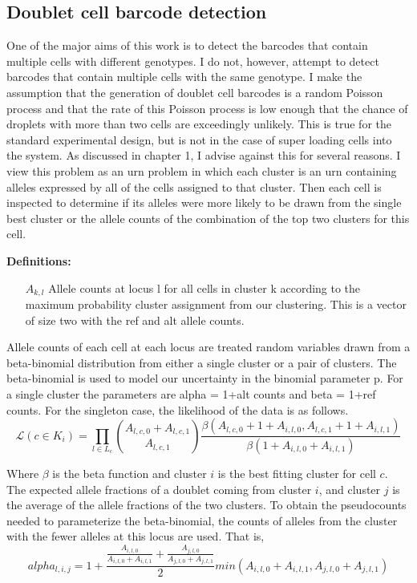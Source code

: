 \subsection{Doublet cell barcode detection}
\par{
One of the major aims of this work is to detect the barcodes that contain multiple cells with different genotypes. 
I do not, however, attempt to detect barcodes that contain multiple cells with the same genotype. I make the assumption that 
the generation of doublet cell barcodes is a random Poisson process and that the rate of this Poisson process is low enough that 
the chance of droplets with more than two cells are exceedingly unlikely. This is true for the standard experimental design, but is not in the case of super loading cells into the system. As discussed in chapter 1, I advise against this for several reasons. I view this problem 
as an urn problem in which each cluster is an urn containing alleles expressed by all of the cells assigned to that cluster. Then each cell is inspected to determine if its alleles were more likely to be drawn from the single best cluster or the allele counts of
the combination of the top two clusters for this cell. \\
}  





\textbf{Definitions:}
\begin{itemize}
\item[$A_{k,l}$] Allele counts at locus l for all cells in cluster k according to the maximum probability cluster assignment from our clustering. This is a vector of size two with the ref and alt allele counts.
\end{itemize}

Allele counts of each cell at each locus are treated random variables drawn from a beta-binomial distribution from either a single cluster or a pair of clusters. The beta-binomial is used to model our uncertainty in the binomial parameter p. For a single cluster the parameters are alpha = 1+alt counts and beta = 1+ref counts. 
For the singleton case, the likelihood of the data is as follows.
\begin{equation}
\mathcal{L}(c \in K_i) = \prod_{l \in L_c} {A_{l,c,0} + A_{l,c,1}  \choose A_{l,c,1}} \frac{\beta(A_{l,c,0} + 1 + A_{i,l,0}, A_{l,c,1} + 1 + A_{i,l,1})}{\beta(1+A_{i,l,0} + A_{i,l,1})}
\end{equation}


Where $\beta$ is the beta function and cluster $i$ is the best fitting cluster for cell $c$. \\
The expected allele fractions of a doublet coming from cluster $i$, and cluster $j$ is the average of the allele fractions of the two clusters. To obtain the pseudocounts needed to parameterize the beta-binomial, the counts of alleles from the cluster with the fewer alleles at this locus are used. That is, 
\begin{equation}
alpha_{l,i,j} = 1 + \frac{\frac{A_{i,l,0}}{A_{i,l,0}+A_{i,l,1}} + \frac{A_{j,l,0}}{A_{j,l,0}+A_{j,l,1}}}{2}min(A_{i,l,0}+A_{i,l,1}, A_{j,l,0}+A_{j,l,1})
\end{equation}

